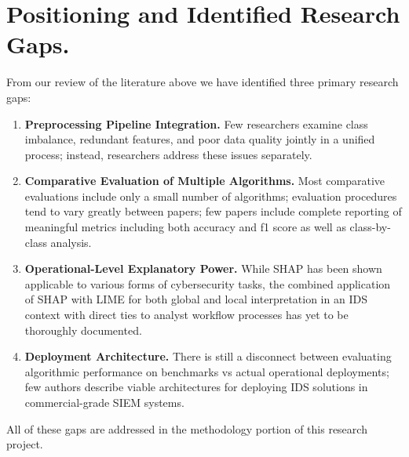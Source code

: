 \section{Positioning and Identified Research Gaps. }

From our review of the literature above we have identified three primary research gaps:

\begin{enumerate}
\item \textbf{Preprocessing Pipeline Integration. }Few researchers examine class imbalance, redundant features, and poor data quality jointly in a unified process; instead, researchers address these issues separately.
\item \textbf{Comparative Evaluation of Multiple Algorithms. }Most comparative evaluations include only a small number of algorithms; evaluation procedures tend to vary greatly between papers; few papers include complete reporting of meaningful metrics including both accuracy and f1 score as well as class-by-class analysis.
\item \textbf{Operational-Level Explanatory Power. }While SHAP has been shown applicable to various forms of cybersecurity tasks, the combined application of SHAP with LIME for both global and local interpretation in an IDS context with direct ties to analyst workflow processes has yet to be thoroughly documented.
\item \textbf{Deployment Architecture. }There is still a disconnect between evaluating algorithmic performance on benchmarks vs actual operational deployments; few authors describe viable architectures for deploying IDS solutions in commercial-grade SIEM systems.
\end{enumerate}

All of these gaps are addressed in the methodology portion of this research project.
